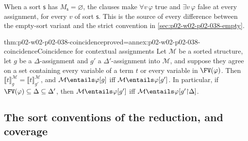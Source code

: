 When a sort \(\mathsf s\) has \(M_{\mathsf s}=\varnothing\), the clauses make
\(\forall v\,\varphi\) true and \(\exists v\,\varphi\) false at every
assignment, for every \(v\) of sort \(\mathsf s\).  This is the source of
every difference between the empty-sort variant and the strict convention in
\cref{sec:p02-w02-p02-038-empty}.

\begin{hblemma}{thm:p02-w02-p02-038-coincidence}{proved=annex:p02-w02-p02-038-coincidence}{Coincidence for contextual assignments}
Let \(\mathcal M\) be a sorted structure, let \(g\) be a \(\Delta\)-assignment
and \(g'\) a \(\Delta'\)-assignment into \(\mathcal M\), and suppose they agree
on a set containing every variable of a term \(t\) or every variable in
\(\FV(\varphi)\).  Then
\(\llbracket t\rrbracket^{\mathcal M}_{g}=\llbracket t\rrbracket^{\mathcal M}_{g'}\),
and \(\mathcal M\entails\varphi[g]\) iff \(\mathcal M\entails\varphi[g']\).
In particular, if \(\FV(\varphi)\subseteq\Delta\subseteq\Delta'\), then
\(\mathcal M\entails\varphi[g']\) iff
\(\mathcal M\entails\varphi[g'{\restriction}\Delta]\).
\end{hblemma}

\subsection{The sort conventions of the reduction, and coverage}
\label{sec:p02-w02-p02-038-coverage}

